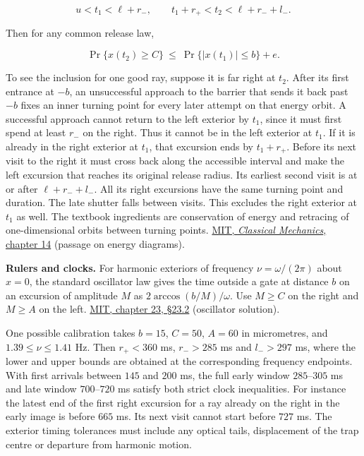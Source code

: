 \documentclass[11pt,a4paper]{article}
\begin{document}
\[
 u<t_1<\ell+r_- ,\qquad
 t_1+r_+<t_2<\ell+r_-+l_- .
\]

Then for any common release law,

\[
 \Pr\{x(t_2)\ge C\}\ \le\ \Pr\{|x(t_1)|\le b\}+e .
\]

To see the inclusion for one good ray, suppose it is far right at
\(t_2\). After its first entrance at \(-b\), an unsuccessful approach to
the barrier that sends it back past \(-b\) fixes an inner turning point
for every later attempt on that energy orbit. A successful approach
cannot return to the left exterior by \(t_1\), since it must first spend
at least \(r_-\) on the right. Thus it cannot be in the left exterior at
\(t_1\). If it is already in the right exterior at \(t_1\), that
excursion ends by \(t_1+r_+\). Before its next visit to the right it
must cross back along the accessible interval and make the left
excursion that reaches its original release radius. Its earliest second
visit is at or after \(\ell+r_-+l_-\). All its right excursions have the
same turning point and duration. The late shutter falls between visits.
This excludes the right exterior at \(t_1\) as well. The textbook
ingredients are conservation of energy and retracing of one-dimensional
orbits between turning points.
\href{https://ocw.mit.edu/courses/8-01sc-classical-mechanics-fall-2016/mit8_01scs22_chapter14.pdf}{MIT,
\emph{Classical Mechanics}, chapter 14} (passage on energy diagrams).

\textbf{Rulers and clocks.} For harmonic exteriors of frequency
\(\nu=\omega/(2\pi)\) about \(x=0\), the standard oscillator law gives
the time outside a gate at distance \(b\) on an excursion of amplitude
\(M\) as \(2\arccos(b/M)/\omega\). Use \(M\ge C\) on the right and
\(M\ge A\) on the left.
\href{https://ocw.mit.edu/courses/8-01sc-classical-mechanics-fall-2016/mit8_01scs22_chapter23.pdf}{MIT,
chapter 23, §23.2} (oscillator solution).

One possible calibration takes \(b=15\), \(C=50\), \(A=60\) in
micrometres, and \(1.39\le\nu\le1.41\) Hz. Then \(r_+<360\) ms,
\(r_->285\) ms and \(l_->297\) ms, where the lower and upper bounds are
obtained at the corresponding frequency endpoints. With first arrivals
between \(145\) and \(200\) ms, the full early window \(285\)--\(305\)
ms and late window \(700\)--\(720\) ms satisfy both strict clock
inequalities. For instance the latest end of the first right excursion
for a ray already on the right in the early image is before \(665\) ms.
Its next visit cannot start before \(727\) ms. The exterior timing
tolerances must include any optical tails, displacement of the trap
centre or departure from harmonic motion.
\end{document}
